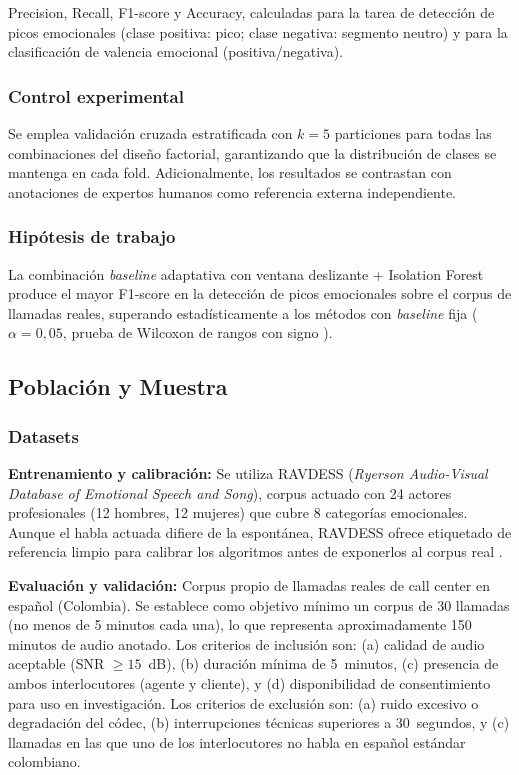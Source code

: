 Precision, Recall, F1-score y Accuracy, calculadas para la tarea de detección de picos
emocionales (clase positiva: pico; clase negativa: segmento neutro) y para la
clasificación de valencia emocional (positiva/negativa).

\subsubsection{Control experimental}

Se emplea validación cruzada estratificada con $k = 5$ particiones para todas las
combinaciones del diseño factorial, garantizando que la distribución de clases se
mantenga en cada fold. Adicionalmente, los resultados se contrastan con anotaciones
de expertos humanos como referencia externa independiente.

\subsubsection{Hipótesis de trabajo}

La combinación \textit{baseline} adaptativa con ventana deslizante + Isolation Forest
produce el mayor F1-score en la detección de picos emocionales sobre el corpus de
llamadas reales, superando estadísticamente a los métodos con \textit{baseline} fija
($\alpha = 0{,}05$, prueba de Wilcoxon de rangos con signo \cite{wilcoxon1945}).

\subsection{Población y Muestra}
\label{sec:met_poblacion}

\subsubsection{Datasets}

\textbf{Entrenamiento y calibración:} Se utiliza RAVDESS (\textit{Ryerson Audio-Visual
Database of Emotional Speech and Song}), corpus actuado con 24 actores profesionales
(12 hombres, 12 mujeres) que cubre 8 categorías emocionales. Aunque el habla actuada
difiere de la espontánea, RAVDESS ofrece etiquetado de referencia limpio para calibrar
los algoritmos antes de exponerlos al corpus real \cite{abdelhamid2022}.

\textbf{Evaluación y validación:} Corpus propio de llamadas reales de call center en
español (Colombia). Se establece como objetivo mínimo un corpus de 30 llamadas (no
menos de 5 minutos cada una), lo que representa aproximadamente 150 minutos de audio
anotado. Los criterios de inclusión son: (a) calidad de audio aceptable (SNR $\geq
15$~dB), (b) duración mínima de 5~minutos, (c) presencia de ambos interlocutores
(agente y cliente), y (d) disponibilidad de consentimiento para uso en investigación.
Los criterios de exclusión son: (a) ruido excesivo o degradación del códec, (b)
interrupciones técnicas superiores a 30~segundos, y (c) llamadas en las que uno de los
interlocutores no habla en español estándar colombiano.

